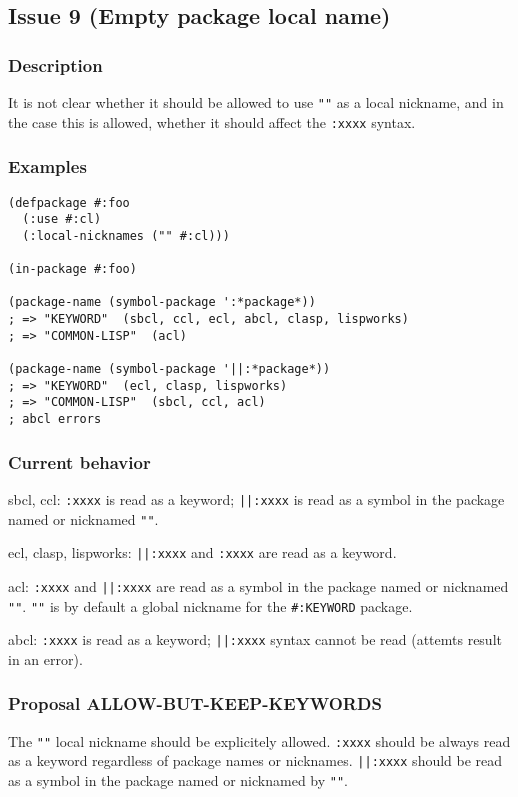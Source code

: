 \documentclass[11pt]{article}
\begin{document}
\subsection{Issue 9 (Empty package local name)}
\label{sec:org84817dc}
\subsubsection{Description}
\label{sec:org9504af1}
It is not clear whether it should be allowed to use \texttt{""} as a local nickname,
and in the case this is allowed, whether it should affect the \texttt{:xxxx} syntax.
\subsubsection{Examples}
\label{sec:org00646b5}
\begin{verbatim}
(defpackage #:foo
  (:use #:cl)
  (:local-nicknames ("" #:cl)))

(in-package #:foo)

(package-name (symbol-package ':*package*))
; => "KEYWORD"  (sbcl, ccl, ecl, abcl, clasp, lispworks)
; => "COMMON-LISP"  (acl)

(package-name (symbol-package '||:*package*))
; => "KEYWORD"  (ecl, clasp, lispworks)
; => "COMMON-LISP"  (sbcl, ccl, acl)
; abcl errors
\end{verbatim}
\subsubsection{Current behavior}
\label{sec:org36dece3}
sbcl, ccl:
\texttt{:xxxx} is read as a keyword;
\texttt{||:xxxx} is read as a symbol in the package named or nicknamed \texttt{""}.

ecl, clasp, lispworks:
\texttt{||:xxxx} and \texttt{:xxxx} are read as a keyword.

acl:
\texttt{:xxxx} and \texttt{||:xxxx} are read as a symbol in the package named or nicknamed \texttt{""}.
\texttt{""} is by default a global nickname for the \texttt{\#:KEYWORD} package.

abcl:
\texttt{:xxxx} is read as a keyword;
\texttt{||:xxxx} syntax cannot be read (attemts result in an error).
\subsubsection{Proposal ALLOW-BUT-KEEP-KEYWORDS}
\label{sec:orgb297a1f}
The \texttt{""} local nickname should be explicitely allowed. \texttt{:xxxx} should be always
read as a keyword regardless of package names or nicknames. \texttt{||:xxxx} should be
read as a symbol in the package named or nicknamed by \texttt{""}.
\end{document}
